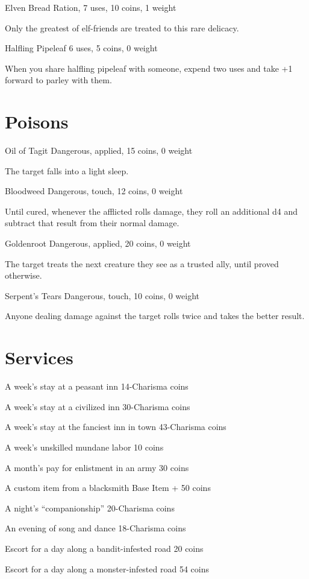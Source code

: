  Elven Bread Ration, 7 uses, 10 coins, 1 weight


 Only the greatest of elf-friends are treated to this rare delicacy.


 Halfling Pipeleaf 6 uses, 5 coins, 0 weight


 When you share halfling pipeleaf with someone, expend two uses and take +1 forward to parley with them.
\section*{Poisons}


 Oil of Tagit Dangerous, applied, 15 coins, 0 weight


 The target falls into a light sleep.


 Bloodweed Dangerous, touch, 12 coins, 0 weight


 Until cured, whenever the afflicted rolls damage, they roll an additional d4 and subtract that result from their normal damage.


 Goldenroot Dangerous, applied, 20 coins, 0 weight


 The target treats the next creature they see as a trusted ally, until proved otherwise.


 Serpent's Tears Dangerous, touch, 10 coins, 0 weight


 Anyone dealing damage against the target rolls twice and takes the better result.
\section*{Services}


 A week's stay at a peasant inn 14-Charisma coins


 A week's stay at a civilized inn 30-Charisma coins


 A week's stay at the fanciest inn in town 43-Charisma coins


 A week's unskilled mundane labor 10 coins


 A month's pay for enlistment in an army 30 coins


 A custom item from a blacksmith Base Item + 50 coins


 A night's ``companionship'' 20-Charisma coins


 An evening of song and dance 18-Charisma coins


 Escort for a day along a bandit-infested road 20 coins


 Escort for a day along a monster-infested road 54 coins


